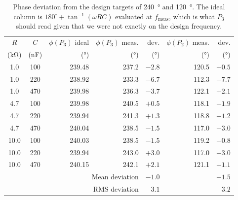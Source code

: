 \documentclass[11pt]{article}
\begin{document}
\begin{table}[H]
    \centering
    \small
    \caption{Phase deviation from the design targets of \qty{240}{\degree} and
    \qty{120}{\degree}. The ideal column is $180^{\circ} + \tan^{-1}(\omega RC)$
    evaluated at $f_{\text{meas}}$, which is what $P_3$ should read given that we
    were not exactly on the design frequency.}
    \label{tab:dev}
    \begin{tabular}{cc r rr rr}
        \toprule
        $R$ & $C$ &
        $\phi(P_3)$ ideal & $\phi(P_3)$ meas. & dev. &
        $\phi(P_2)$ meas. & dev. \\
        (\unit{\kilo\ohm}) & (\unit{\nano\farad}) &
        (\unit{\degree}) & (\unit{\degree}) & (\unit{\degree}) &
        (\unit{\degree}) & (\unit{\degree}) \\
        \midrule
        1.0  & 100 & 239.48 & 237.2 & $-2.8$ & 120.5 & $+0.5$ \\
        1.0  & 220 & 238.92 & 233.3 & $-6.7$ & 112.3 & $-7.7$ \\
        1.0  & 470 & 239.98 & 236.3 & $-3.7$ & 122.1 & $+2.1$ \\
        4.7  & 100 & 239.98 & 240.5 & $+0.5$ & 118.1 & $-1.9$ \\
        4.7  & 220 & 239.94 & 241.3 & $+1.3$ & 118.8 & $-1.2$ \\
        4.7  & 470 & 240.04 & 238.5 & $-1.5$ & 117.0 & $-3.0$ \\
        10.0 & 100 & 240.03 & 238.5 & $-1.5$ & 119.2 & $-0.8$ \\
        10.0 & 220 & 239.94 & 243.0 & $+3.0$ & 117.0 & $-3.0$ \\
        10.0 & 470 & 240.15 & 242.1 & $+2.1$ & 121.1 & $+1.1$ \\
        \midrule
        \multicolumn{4}{r}{Mean deviation\quad} & $-1.0$ & & $-1.5$ \\
        \multicolumn{4}{r}{RMS deviation\quad}  & $3.1$  & & $3.2$ \\
        \bottomrule
    \end{tabular}
\end{table}

\end{document}
